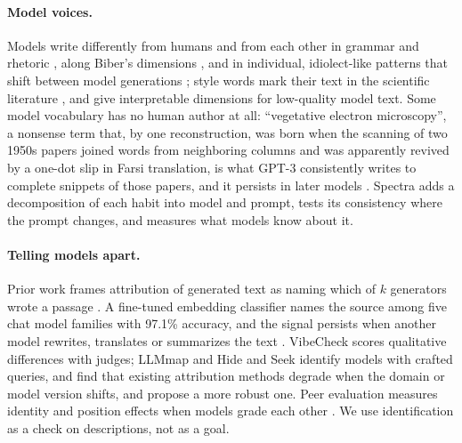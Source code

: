 \documentclass[11pt]{article}
\begin{document}
\paragraph{Model voices.}
Models write differently from humans and from each other in grammar and rhetoric \citep{reinhart2025writelikehumans}, along Biber's dimensions \citep{milicka2026stylisticvariation}, and in individual, idiolect-like patterns that shift between model generations \citep{rudnicka2026idiolect}; style words mark their text in the scientific literature \citep{kobak2024delving}, and \citet{shaib2025slop} give interpretable dimensions for low-quality model text.
Some model vocabulary has no human author at all: ``vegetative electron microscopy'', a nonsense term that, by one reconstruction, was born when the scanning of two 1950s papers joined words from neighboring columns and was apparently revived by a one-dot slip in Farsi translation, is what GPT-3 consistently writes to complete snippets of those papers, and it persists in later models \citep{snoswell2025vegetative}.
Spectra adds a decomposition of each habit into model and prompt, tests its consistency where the prompt changes, and measures what models know about it.

\paragraph{Telling models apart.}
Prior work frames attribution of generated text as naming which of $k$ generators wrote a passage \citep{uchendu2020attribution,uchendu2021turingbench,huang2024attributionsurvey}.
A fine-tuned embedding classifier names the source among five chat model families with 97.1\% accuracy, and the signal persists when another model rewrites, translates or summarizes the text \citep{sun2025idiosyncrasies}.
VibeCheck \citep{dunlap2025vibecheck} scores qualitative differences with judges; LLMmap \citep{pasquini2025llmmap} and Hide and Seek \citep{iourovitski2024hideseek} identify models with crafted queries, and \citet{ko2026whosbehind} find that existing attribution methods degrade when the domain or model version shifts, and propose a more robust one.
Peer evaluation measures identity and position effects when models grade each other \citep{margalit2026agentsaspeers}.
We use identification as a check on descriptions, not as a goal.
\end{document}
